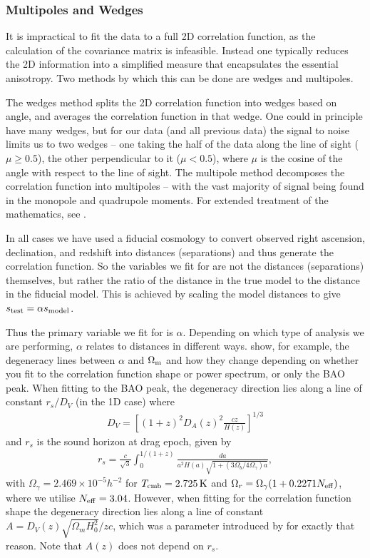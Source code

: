 \documentclass[a4paper,fleqn,usenatbib]{mnras}
\begin{document}
\subsubsection{Multipoles and Wedges}

It is impractical to fit the data to a full 2D correlation function, as the calculation of the covariance matrix is infeasible.  Instead one typically reduces the 2D information into a simplified measure that encapsulates the essential anisotropy.  Two methods by which this can be done are wedges and multipoles.  

The wedges method splits the 2D correlation function into wedges based on angle, and averages the correlation function in that wedge.  One could in principle have many wedges, but for our data (and all previous data) the signal to noise limits us to two wedges -- one taking the half of the data along the line of sight ($\mu\ge0.5$), the other perpendicular to it ($\mu<0.5$), where $\mu$ is the cosine of the angle with respect to the line of sight. The multipole method decomposes the correlation function into multipoles -- with the vast majority of signal being found in the monopole and quadrupole moments.  For extended treatment of the mathematics, see \citet{KazinSanchezBlanton2012, KazinSanchezCuesta2013, SanchezKazinBeutler2013, XuCuesta2013}. 

In all cases we have used a fiducial cosmology to convert observed right ascension, declination, and redshift into distances (separations) and thus generate the correlation function.  So the variables we fit for are not the distances (separations) themselves, but rather the ratio of the distance in the true model to the distance in the fiducial model.  This is achieved by scaling the model distances to give $s_{\rm test}= \alpha s_{\rm model}$.   

Thus the primary variable we fit for is $\alpha$.  Depending on which type of analysis we are performing, $\alpha$ relates to  distances in different ways.  \citet{BlakeDavis2011} show, for example, the degeneracy lines between $\alpha$ and $\Omega_{\rm m}$ and how they change depending on whether you fit to the correlation function shape or power spectrum, or only the BAO peak.  When fitting to the BAO peak, the degeneracy direction lies along a line of constant $r_s/D_V$ (in the 1D case)  where 
\begin{align}
D_V=\left[ (1+z)^2 D_A(z)^2 \frac{cz}{H(z)}\right]^{1/3}
\end{align}
and $r_s$ is the sound horizon at drag epoch, given by
\begin{align}
r_s = \frac{c}{\sqrt{3}} \int_0^{1/(1+z)} \frac{da}{a^2 H(a) \sqrt{1 + (3\Omega_b/4\Omega_\gamma) a}}, \label{eq:rs}
\end{align}
with $\Omega_\gamma = 2.469\times10^{-5} h^{-2}$ for $T_{{\rm cmb}}=2.725\,{\rm K}$ and $\Omega_r = \Omega_\gamma(1 + 0.2271 N_{{\rm eff}})$, where we utilise $N_{\rm eff} = 3.04$.
However, when fitting for the correlation function shape the degeneracy direction lies along a line of constant $A=D_V(z) \sqrt{\Omega_m H_0^2} / zc$, which was a parameter introduced by \citet{Eisenstein2005} for exactly that reason.  Note that $A(z)$ does not depend on $r_s$.  
\end{document}
